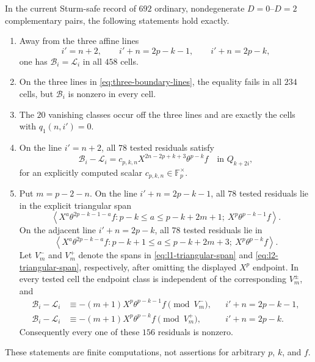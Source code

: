 \begin{computationalresult}
\label{prop:finite-direct-audit}
In the current Sturm-safe record of $692$ ordinary, nondegenerate
$D=0$--$D=2$ complementary pairs, the following statements hold exactly.
\begin{enumerate}
\item Away from the three affine lines
\begin{equation}\label{eq:three-boundary-lines}
 i'=n+2,
 \qquad i'+n=2p-k-1,
 \qquad i'+n=2p-k,
\end{equation}
one has $\mathcal B_i=\mathcal L_i$ in all $458$ cells.
\item On the three lines in \eqref{eq:three-boundary-lines}, the equality
fails in all $234$ cells, but $\mathcal B_i$ is nonzero in every cell.
\item The $20$ vanishing classes occur off the three lines and are exactly
the cells with $q_1(n,i')=0$.
\item On the line $i'=n+2$, all $78$ tested residuals satisfy
\begin{equation}\label{eq:l3-residual}
 \mathcal B_i-\mathcal L_i
 =c_{p,k,n}X^{2n-2p+k+3}\theta^{p-k}f
 \quad\text{in }Q_{k+2i},
\end{equation}
for an explicitly computed scalar $c_{p,k,n}\in\mathbb F_p^\times$.
\item Put $m=p-2-n$.  On the line $i'+n=2p-k-1$, all $78$
tested residuals lie in the explicit triangular span
\begin{equation}\label{eq:l1-triangular-span}
 \left\langle
 X^a\theta^{2p-k-1-a}f:
 p-k\le a\le p-k+2m+1;
 \ X^p\theta^{p-k-1}f
 \right\rangle .
\end{equation}
On the adjacent line $i'+n=2p-k$, all $78$ tested residuals lie in
\begin{equation}\label{eq:l2-triangular-span}
 \left\langle
 X^a\theta^{2p-k-a}f:
 p-k+1\le a\le p-k+2m+3;
 \ X^p\theta^{p-k}f
 \right\rangle .
\end{equation}
Let $V_m^-$ and $V_m^+$ denote the spans in
\eqref{eq:l1-triangular-span} and \eqref{eq:l2-triangular-span},
respectively, after omitting the displayed $X^p$ endpoint.  In every
tested cell the endpoint class is independent of the corresponding
$V_m^\pm$, and
\begin{align}
 \mathcal B_i-\mathcal L_i
  &\equiv -(m+1)X^p\theta^{p-k-1}f\pmod{V_m^-},
  && i'+n=2p-k-1, \label{eq:l1-endpoint}\\
 \mathcal B_i-\mathcal L_i
  &\equiv -(m+1)X^p\theta^{p-k}f\pmod{V_m^+},
  && i'+n=2p-k. \label{eq:l2-endpoint}
\end{align}
Consequently every one of these $156$ residuals is nonzero.
\end{enumerate}
These statements are finite computations, not assertions for arbitrary
$p$, $k$, and $f$.
\end{computationalresult}

